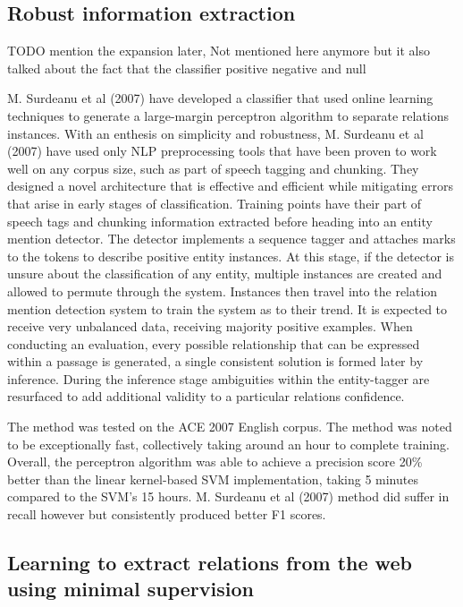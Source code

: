 \documentclass[11pt]{article} %
\begin{document}
\subsection{Robust information extraction}

TODO mention the expansion later, Not mentioned here anymore but it also talked about the fact that the classifier positive negative and null

M. Surdeanu et al (2007) have developed a classifier that used online learning techniques to generate a large-margin perceptron algorithm to separate relations instances. With an enthesis on simplicity and robustness, M. Surdeanu et al (2007) have used only NLP preprocessing tools that have been proven to work well on any corpus size, such as part of speech tagging and chunking. They designed a novel architecture that is effective and efficient while mitigating errors that arise in early stages of classification. Training points have their part of speech tags and chunking information extracted before heading into an entity mention detector. The detector implements a sequence tagger and attaches marks to the tokens to describe positive entity instances. At this stage, if the detector is unsure about the classification of any entity, multiple instances are created and allowed to permute through the system. Instances then travel into the relation mention detection system to train the system as to their trend. It is expected to receive very unbalanced data, receiving majority positive examples. When conducting an evaluation, every possible relationship that can be expressed within a passage is generated, a single consistent solution is formed later by inference. During the inference stage ambiguities within the entity-tagger are resurfaced to add additional validity to a particular relations confidence.

The method was tested on the ACE 2007 English corpus. The method was noted to be exceptionally fast, collectively taking around an hour to complete training. Overall, the perceptron algorithm was able to achieve a precision score 20\% better than the linear kernel-based SVM implementation, taking 5 minutes compared to the SVM’s 15 hours. M. Surdeanu et al (2007) method did suffer in recall however but consistently produced better F1 scores.

\subsection{Learning to extract relations from the web using minimal supervision}
\end{document}

